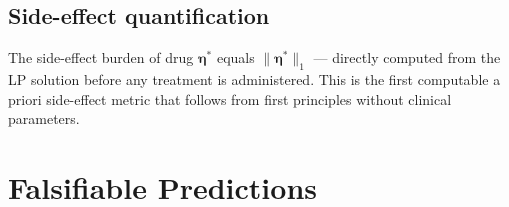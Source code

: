\documentclass[twocolumn,11pt,a4paper]{article}
\newcommand{\drugvec}{\boldsymbol{\eta}}
\begin{document}
\subsection{Side-effect quantification}

\begin{corollary}\label{cor:sideeffect}
The side-effect burden of drug $\drugvec^*$ equals $\|\drugvec^*\|_1$
--- directly computed from the LP solution before any treatment is
administered. This is the first computable a priori side-effect
metric that follows from first principles without clinical parameters.
\end{corollary}



\section{Falsifiable Predictions}
\label{sec:predictions}
\end{document}
